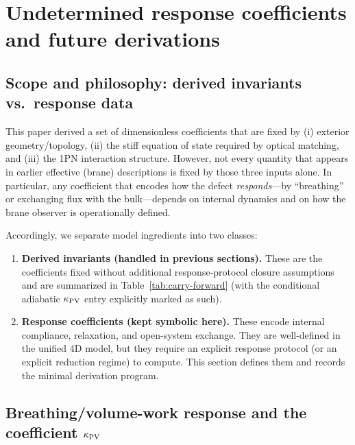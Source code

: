 \documentclass[11pt]{article}
\begin{document}
\section{Undetermined response coefficients and future derivations}
\label{sec:undetermined}

\subsection{Scope and philosophy: derived invariants vs.\ response data}
\label{sec:undetermined:philosophy}

This paper derived a set of dimensionless coefficients that are fixed by (i) exterior geometry/topology,
(ii) the stiff equation of state required by optical matching, and (iii) the 1PN interaction structure.
However, not every quantity that appears in earlier effective (brane) descriptions is fixed by those
three inputs alone. In particular, any coefficient that encodes how the defect \emph{responds}---by
``breathing'' or exchanging flux with the bulk---depends on internal dynamics and on how the brane
observer is operationally defined.

Accordingly, we separate model ingredients into two classes:

\begin{enumerate}
  \item \textbf{Derived invariants (handled in previous sections).}
  These are the coefficients fixed without additional response-protocol closure assumptions and are summarized in
  Table~\ref{tab:carry-forward} (with the conditional adiabatic \(\kappa_{\rm PV}\) entry explicitly marked as such).
  \item \textbf{Response coefficients (kept symbolic here).}
  These encode internal compliance, relaxation, and open-system exchange. They are well-defined in
  the unified 4D model, but they require an explicit response protocol (or an explicit reduction
  regime) to compute. This section defines them and records the minimal derivation program.
\end{enumerate}

\subsection{Breathing/volume-work response and the coefficient \texorpdfstring{$\kappa_{\rm PV}$}{kappaPV}}
\label{sec:undetermined:kappaPV}
\end{document}
